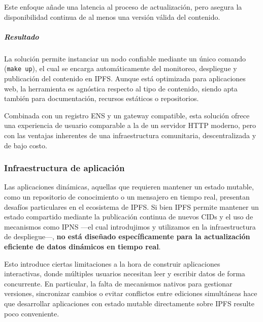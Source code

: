 Este enfoque añade una latencia al proceso de actualización, pero asegura la disponibilidad continua de al menos una versión válida del contenido.



\subparagraph{Resultado}

La solución permite instanciar un nodo confiable mediante un único comando (\texttt{make up}), el cual se encarga automáticamente del monitoreo, despliegue y publicación del contenido en IPFS. Aunque está optimizada para aplicaciones web, la herramienta es agnóstica respecto al tipo de contenido, siendo apta también para documentación, recursos estáticos o repositorios.

Combinada con un registro ENS y un gateway compatible, esta solución ofrece una experiencia de usuario comparable a la de un servidor HTTP moderno, pero con las ventajas inherentes de una infraestructura comunitaria, descentralizada y de bajo costo.

\subsubsection{Infraestructura de aplicación}

Las aplicaciones dinámicas, aquellas que requieren mantener un estado mutable, como un repositorio de conocimiento o un mensajero en tiempo real, presentan desafíos particulares en el ecosistema de IPFS. Si bien IPFS permite mantener un estado compartido mediante la publicación continua de nuevos CIDs y el uso de mecanismos como IPNS —el cual introdujimos y utilizamos en la infraestructura de despliegue—, \textbf{no está diseñado específicamente para la actualización eficiente de datos dinámicos en tiempo real}.

Esto introduce ciertas limitaciones a la hora de construir aplicaciones interactivas, donde múltiples usuarios necesitan leer y escribir datos de forma concurrente. En particular, la falta de mecanismos nativos para gestionar versiones, sincronizar cambios o evitar conflictos entre ediciones simultáneas hace que desarrollar aplicaciones con estado mutable directamente sobre IPFS resulte poco conveniente.

